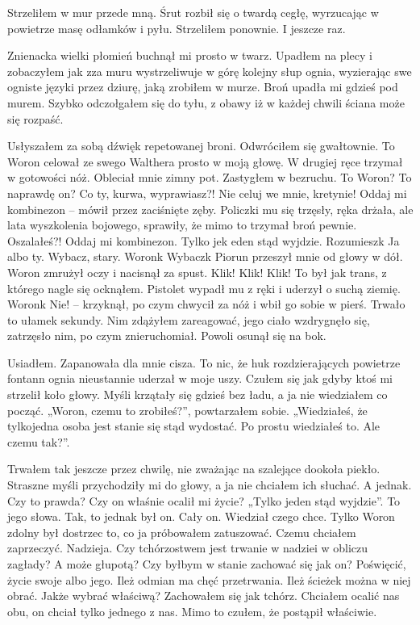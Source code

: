 \documentclass[../MAIN.tex]{subfiles}
\begin{document}
Strzeliłem w mur przede mną. Śrut rozbił się o twardą cegłę, wyrzucając w powietrze masę odłamków i pyłu. Strzeliłem ponownie. I jeszcze raz.

Znienacka wielki płomień buchnął mi prosto w twarz. Upadłem na plecy i zobaczyłem jak zza muru wystrzeliwuje w górę kolejny słup ognia, wyzierając swe ogniste języki przez dziurę, jaką zrobiłem w murze. Broń upadła mi gdzieś pod murem. Szybko odczołgałem się do tyłu, z obawy iż w każdej chwili ściana może się rozpaść.

Usłyszałem za sobą dźwięk repetowanej broni. Odwróciłem się gwałtownie. To Woron celował ze swego Walthera prosto w moją głowę. W drugiej ręce trzymał w gotowości nóż.
Obleciał mnie zimny pot. Zastygłem w bezruchu. To Woron? To naprawdę on?
\sd
\xx Co ty, kurwa, wyprawiasz?! Nie celuj we mnie, kretynie!
\xx Oddaj mi kombinezon – mówił przez zaciśnięte zęby. Policzki mu się trzęsły, ręka drżała, ale lata wyszkolenia bojowego, sprawiły, że mimo to trzymał broń pewnie.
\xx Oszalałeś?!
\xx Oddaj mi kombinezon. Tylko je\3k eden stąd wyjdzie. Rozumiesz\3k Ja albo ty. Wybacz, stary.
\xx Woron\3k
\xx Wybacz\3k
Piorun przeszył mnie od głowy w dół. Woron zmrużył oczy i nacisnął za spust.
\vspace{.6em}
\xx Klik!
\vspace{.6em}
\xx Klik!
\vspace{.6em}
\xx Klik!
\vspace{.6em}
\qd
To był jak trans, z którego nagle się ocknąłem. Pistolet wypadł mu z ręki i uderzył o suchą ziemię.
\sx Woron\3k
\xx Nie! – krzyknął, po czym chwycił za nóż i wbił go sobie w pierś.
\qd
Trwało to ułamek sekundy. Nim zdążyłem zareagować, jego ciało wzdrygnęło się, zatrzęsło nim, po czym znieruchomiał.
Powoli osunął się na bok.

Usiadłem. Zapanowała dla mnie cisza. To nic, że huk rozdzierających powietrze fontann ognia nieustannie uderzał w moje uszy. Czułem się jak gdyby ktoś mi strzelił koło głowy. Myśli krzątały się gdzieś bez ładu, a ja nie wiedziałem co począć.
  „Woron, czemu to zrobiłeś?”, powtarzałem sobie. „Wiedziałeś, że tylkojedna osoba jest stanie się stąd wydostać. Po prostu wiedziałeś to. Ale czemu tak?”.

Trwałem tak jeszcze przez chwilę, nie zważając na szalejące dookoła piekło. Straszne myśli przychodziły mi do głowy, a ja nie chciałem ich słuchać. A jednak. Czy to prawda? Czy on właśnie ocalił mi życie?
„Tylko jeden stąd wyjdzie”. To jego słowa. Tak, to jednak był on. Cały on. Wiedział czego chce. Tylko Woron zdolny był dostrzec to, co ja próbowałem zatuszować. Czemu chciałem zaprzeczyć.
Nadzieja. Czy tchórzostwem jest trwanie w nadziei w obliczu zagłady? A może głupotą? Czy byłbym w stanie zachować się jak on? Poświęcić, życie swoje albo jego. Ileż odmian ma chęć przetrwania. Ileż ścieżek można w niej obrać. Jakże wybrać właściwą?
Zachowałem się jak tchórz. Chciałem ocalić nas obu, on chciał tylko jednego z nas. Mimo to czułem, że postąpił właściwie.
\end{document}
